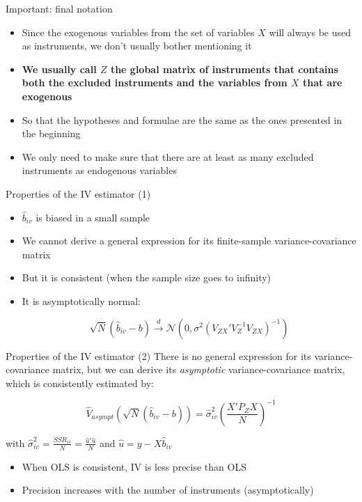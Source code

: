 \documentclass[aspectratio=169]{beamer}
\begin{document}
\begin{frame}{Important: final notation}
\begin{itemize}
    \item Since the exogenous variables from the set of variables $X$ will always be used as instruments, we don't usually bother mentioning it
    \item \textbf{We usually call $Z$ the global matrix of instruments that contains both the excluded instruments and the variables from $X$ that are exogenous}
    \item So that the hypotheses and formulae are the same as the ones presented in the beginning
    \item We only need to make sure that there are at least as many excluded instruments as endogenous variables
\end{itemize}
\end{frame}

\begin{frame}{Properties of the IV estimator (1)}
\begin{itemize}
    \item $\hat{b}_{iv}$ is biased in a small sample
    \item We cannot derive a general expression for its finite-sample variance-covariance matrix
    \item But it is consistent (when the sample size goes to infinity)
    \item It is asymptotically normal:

    \[\sqrt{N}(\hat{b}_{iv} - b) \xrightarrow{d} \mathcal{N}\left(0, \sigma^2(V_{ZX}'V_Z^{-1}V_{ZX})^{-1}\right)\]
\end{itemize}
\end{frame}

\begin{frame}{Properties of the IV estimator (2)}
There is no general expression for its variance-covariance matrix, but we can derive its \emph{asymptotic} variance-covariance matrix, which is consistently estimated by:

\[\widehat{V}_{asympt}\left(\sqrt{N}(\hat{b}_{iv} - b)\right) = \hat{\sigma}_{iv}^2\left(\frac{X'P_ZX}{N}\right)^{-1}\]

with $\hat{\sigma}_{iv}^2 = \frac{SSR_{iv}}{N} = \frac{\hat{u}'\hat{u}}{N}$ and $\hat{u} = y - X\hat{b}_{iv}$

\begin{itemize}
    \item When OLS is consistent, IV is less precise than OLS
    \item Precision increases with the number of instruments (asymptotically)
\end{itemize}
\end{frame}
\end{document}
